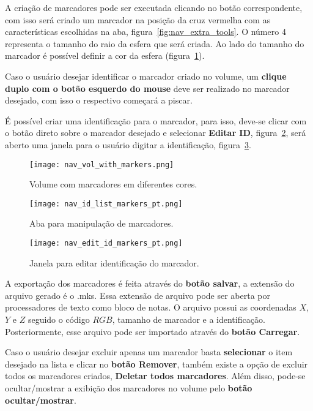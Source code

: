 A criação de marcadores pode ser executada clicando no botão correspondente, com isso será criado um marcador na posição da cruz vermelha com as características escolhidas na aba, figura~\ref{fig:nav_extra_tools}. O número 4 representa o tamanho do raio da esfera que será criada. Ao lado do tamanho do marcador é possível definir a cor da esfera (figura~\ref{fig:nav_vol_with_markers}). 

Caso o usuário desejar identificar o marcador criado no volume, um \textbf{clique duplo com o botão esquerdo do mouse} deve ser realizado no marcador desejado, com isso o respectivo começará a piscar.

É possível criar uma identificação para o marcador, para isso, deve-se clicar com o botão direto sobre o marcador desejado e selecionar \textbf{Editar ID}, figura~\ref{fig:nav_id_list_markers}, será aberto uma janela para o usuário digitar a identificação, figura~\ref{fig:nav_edit_id_markers}.

\begin{figure}[!htb]
\centering
\texttt{[image: nav\_vol\_with\_markers.png]}
\caption{Volume com marcadores em diferentes cores.}
\label{fig:nav_vol_with_markers}
\end{figure} 

\begin{figure}[!htb]
\centering
\texttt{[image: nav\_id\_list\_markers\_pt.png]}
\caption{Aba para manipulação de marcadores.}
\label{fig:nav_id_list_markers}
\end{figure} 

\begin{figure}[!htb]
\centering
\texttt{[image: nav\_edit\_id\_markers\_pt.png]}
\caption{Janela para editar identificação do marcador.}
\label{fig:nav_edit_id_markers}
\end{figure} 

A exportação dos marcadores é feita através do \textbf{botão salvar}, a extensão do arquivo gerado é o .mks. Essa extensão de arquivo pode ser aberta por processadores de texto como bloco de notas. O arquivo possui as coordenadas $X$, $Y$ e $Z$ seguido o código $RGB$, tamanho de marcador e a identificação. Posteriormente, esse arquivo pode ser importado através do \textbf{botão Carregar}.

Caso o usuário desejar excluir apenas um marcador basta \textbf{selecionar} o item desejado na lista e clicar no \textbf{botão Remover}, também existe a opção de excluir todos os marcadores criados, \textbf{Deletar todos marcadores}. Além disso, pode-se ocultar/mostrar a exibição dos marcadores no volume pelo \textbf{botão ocultar/mostrar}.

